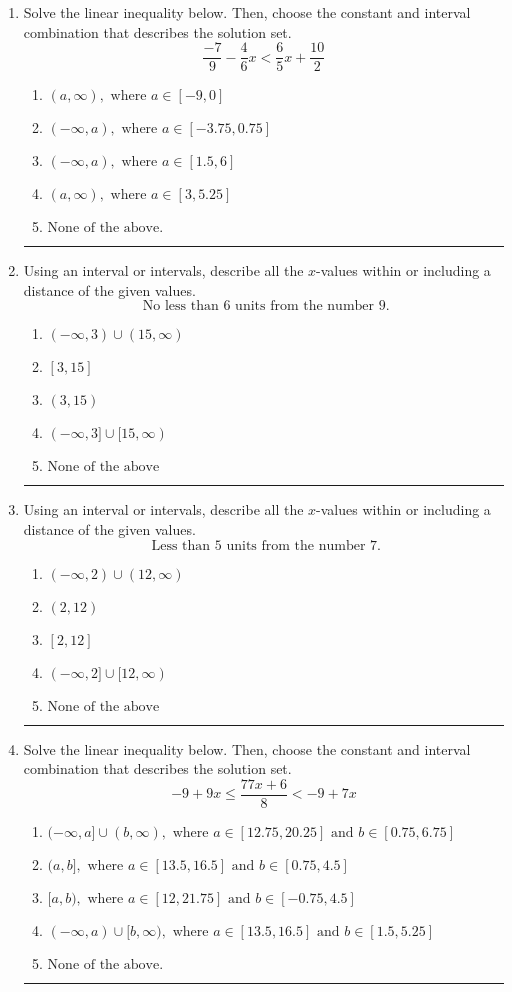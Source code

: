 \documentclass[14pt]{extbook}
\newcommand{\litem}[1]{\item#1\hspace*{-1cm}\rule{\textwidth}{0.4pt}}
\begin{document}
\begin{enumerate}
{\begin{enumerate}[label=\Alph*.]
\end{enumerate} }
\litem{
Solve the linear inequality below. Then, choose the constant and interval combination that describes the solution set.\[ \frac{-7}{9} - \frac{4}{6} x < \frac{6}{5} x + \frac{10}{2} \]\begin{enumerate}[label=\Alph*.]
\item \( (a, \infty), \text{ where } a \in [-9, 0] \)
\item \( (-\infty, a), \text{ where } a \in [-3.75, 0.75] \)
\item \( (-\infty, a), \text{ where } a \in [1.5, 6] \)
\item \( (a, \infty), \text{ where } a \in [3, 5.25] \)
\item \( \text{None of the above}. \)

\end{enumerate} }
\litem{
Using an interval or intervals, describe all the $x$-values within or including a distance of the given values.\[ \text{ No less than } 6 \text{ units from the number } 9. \]\begin{enumerate}[label=\Alph*.]
\item \( (-\infty, 3) \cup (15, \infty) \)
\item \( [3, 15] \)
\item \( (3, 15) \)
\item \( (-\infty, 3] \cup [15, \infty) \)
\item \( \text{None of the above} \)

\end{enumerate} }
\litem{
Using an interval or intervals, describe all the $x$-values within or including a distance of the given values.\[ \text{ Less than } 5 \text{ units from the number } 7. \]\begin{enumerate}[label=\Alph*.]
\item \( (-\infty, 2) \cup (12, \infty) \)
\item \( (2, 12) \)
\item \( [2, 12] \)
\item \( (-\infty, 2] \cup [12, \infty) \)
\item \( \text{None of the above} \)

\end{enumerate} }
\litem{
Solve the linear inequality below. Then, choose the constant and interval combination that describes the solution set.\[ -9 + 9 x \leq \frac{77 x + 6}{8} < -9 + 7 x \]\begin{enumerate}[label=\Alph*.]
\item \( (-\infty, a] \cup (b, \infty), \text{ where } a \in [12.75, 20.25] \text{ and } b \in [0.75, 6.75] \)
\item \( (a, b], \text{ where } a \in [13.5, 16.5] \text{ and } b \in [0.75, 4.5] \)
\item \( [a, b), \text{ where } a \in [12, 21.75] \text{ and } b \in [-0.75, 4.5] \)
\item \( (-\infty, a) \cup [b, \infty), \text{ where } a \in [13.5, 16.5] \text{ and } b \in [1.5, 5.25] \)
\item \( \text{None of the above.} \)


\end{enumerate}}
\end{enumerate}
\end{document}
